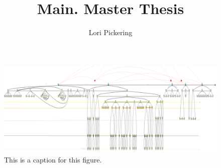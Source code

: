 \documentclass[hidelinks,12pt,a4paper]{report}
\begin{document}
\lstset{language=ML, basicstyle=\scriptsize}
\title{Main. Master Thesis}
\author{Lori Pickering}

\begin{figure}[t]
\includegraphics[width=\textwidth]{../figures/overalldiagramsquashed.png}
\caption{This is a caption for this figure.}
\end{figure}

\begin{doublespace}
\cleardoublepage {}
{}

\setcounter{page}{1}
\end{doublespace}
\cleardoublepage {}

\tableofcontents
\cleardoublepage



\hypersetup{
  colorlinks   = true, %
  urlcolor     = blue, %
  linkcolor    = blue, %
  citecolor   = red %
}

\cleardoublepage {}
\listoffigures

\cleardoublepage {}
\listoftables

\cleardoublepage
%
\printnoidxglossary[type=\acronymtype, title={List of Acronyms}]
\cleardoublepage

\parskip=18pt
\raggedright

\begin{doublespace}

\cleardoublepage


\cleardoublepage


\cleardoublepage


\cleardoublepage


\cleardoublepage


\cleardoublepage


\cleardoublepage


\cleardoublepage


\cleardoublepage
\end{doublespace}
\cleardoublepage
\end{document}
